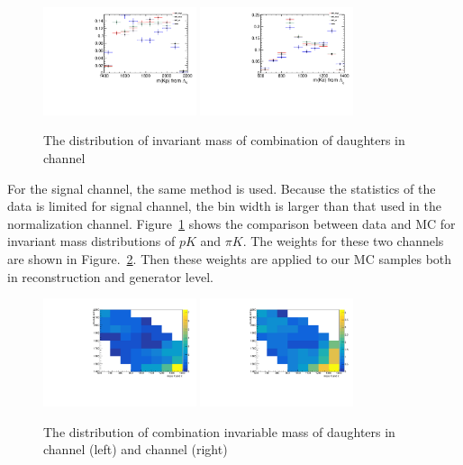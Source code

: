 \begin{figure}[bth]
\centering
\includegraphics[width=0.4\textwidth]{Figures/05_open_charm/04_tune/dalitz/signal_channel/mkp.pdf}%
\includegraphics[width=0.4\textwidth]{Figures/05_open_charm/04_tune/dalitz/signal_channel/mkpi.pdf}%
\caption{ The distribution of invariant mass of combination of \Lc daughters in \LbLckkpi channel}
\label{Fig.dalitz_distri_kkpi}
\end{figure}


For the signal channel, the same method is used. 
Because the statistics of the data is limited for signal channel, 
the bin width is larger than that used in the normalization channel. 
Figure~\ref{Fig.dalitz_distri_kkpi} shows the comparison between data and MC for invariant mass distributions of $pK$ and $\pi K$. 
The weights for these two channels are shown in Figure.~\ref{Fig.dalitz_ratio}. 
Then these weights are applied to our MC samples both in reconstruction and generator level.

\begin{figure}[bth]
\centering
\includegraphics[width=0.4\textwidth]{Figures/05_open_charm/04_tune/dalitz/ratio_dalitz_ds.pdf}%
\includegraphics[width=0.4\textwidth]{Figures/05_open_charm/04_tune/dalitz/ratio_dalitz_kkpi.pdf}%
	\caption{ The distribution of combination invariable mass of \Lc daughters in \LbLcDs channel (left) and \LbLckkpi channel (right)}
\label{Fig.dalitz_ratio}
\end{figure}



